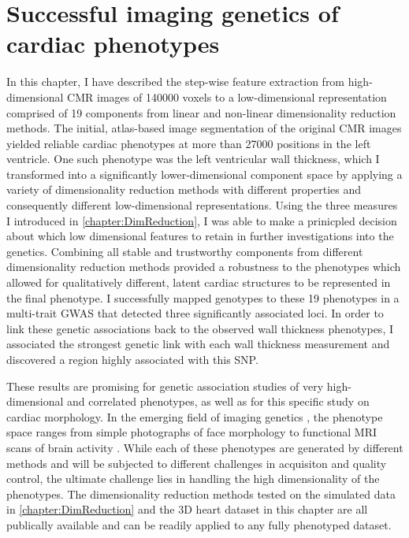 \newpage
\section{Successful imaging genetics of cardiac phenotypes}
In this chapter, I have described the step-wise feature extraction from high-dimensional CMR images of \num{140000} voxels to a low-dimensional  representation comprised of \num{19} components from linear and non-linear dimensionality reduction methods. The initial, atlas-based image segmentation of the original CMR images yielded reliable cardiac phenotypes at more than \num{27000} positions in the left ventricle. One such phenotype was the left ventricular wall thickness, which I transformed into a significantly lower-dimensional component space by applying a variety of dimensionality reduction methods with different properties and consequently different low-dimensional representations. Using the three measures I introduced in \cref{chapter:DimReduction}, I was able to make a prinicpled decision about which low dimensional features to retain in further investigations into the genetics. Combining all stable and trustworthy components from different dimensionality reduction methods provided a robustness to the phenotypes which allowed for qualitatively different, latent cardiac structures to be represented in the final phenotype. I successfully mapped genotypes to these \num{19} phenotypes in a multi-trait GWAS that detected three significantly associated loci. In order to link these genetic associations back to the observed wall thickness phenotypes, I associated the strongest genetic link with each wall thickness measurement and discovered a region highly associated with this SNP.  

These results are promising for genetic association studies of very high-dimensional and correlated phenotypes, as well as for this specific study on cardiac morphology. In the emerging field of imaging genetics \citep{Ge2014}, the phenotype space ranges from simple photographs of face morphology \citep{Liu2012,Shaffer2016} to  functional MRI scans of brain activity  \citep{Stein2010,Hibar2015}. While each of these phenotypes are generated by different methods and will be subjected to different challenges in acquisiton and quality control, the ultimate challenge lies in handling the high dimensionality of the phenotypes. The dimensionality reduction methods tested on the simulated data in \cref{chapter:DimReduction} and the 3D heart dataset in this chapter are all publically available and can be readily applied to any fully phenotyped dataset. 

